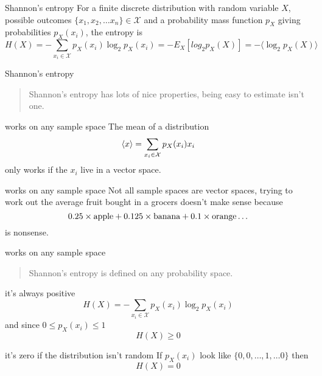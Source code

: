 \documentclass{beamer}
\newcommand{\crish}{\color{reddish}}
\newcommand{\cbla}{\color{black}}
\newcommand{\cblu}{\color{blue}}
\newcommand{\sm}{\color{reddish}$}
\newcommand{\fm}{$\color{black}{}}
\begin{document}
\begin{frame}{Shannon's entropy}
  For a finite discrete distribution with random variable \sm X\fm,
  possible outcomes \sm\{x_1,x_2,\ldots x_n\}\in\mathcal{X}\fm{} and a
  probability mass function \sm p_X\fm{} giving probabilities \sm p_X(x_i)\fm, the
  entropy is
\crish
  $$
H(X)=-\sum_{x_i\in \mathcal{X}}{p_X(x_i)\log_2p_X(x_i)}=-E_X[log_2{p_X(X)}]=-\langle \log_2{p_X(X)}\rangle
  $$
\cbla
\end{frame}

\begin{frame}{Shannon's entropy}
  \begin{quote}
    Shannon's entropy has lots of nice properties, being easy to estimate isn't one.
  \end{quote}
\end{frame}

\begin{frame}{works on any sample space}
The mean of a distribution
\crish
$$
\langle x\rangle = \sum_{x_i\in \mathcal{X}}{p_X(x_i)\cblu{}x_i\crish{}}
$$
\cbla
only works if the \cblu $x_i$\cbla{} live in a vector space. 
  \end{frame}


\begin{frame}{works on any sample space}
Not all sample spaces are vector spaces, trying to work out the average fruit bought in a grocers doesn't make sense because
\crish
$$
0.25\times \mbox{\color{green}apple\crish}+0.125\times \mbox{\color{yellow}banana\crish}+0.1\times \mbox{\color{orange}orange\crish}\ldots
$$ \cbla is nonsense.
  \end{frame}


\begin{frame}{works on any sample space}
  \begin{quote}
    Shannon's entropy is defined on any probability space.
    \end{quote}
  
  \end{frame}


\begin{frame}{it's always positive}
\crish
  $$
H(X)=-\sum_{x_i\in \mathcal{X}}{p_X(x_i)\log_2p_X(x_i)}
$$
\cbla
 and since \sm 0\le p_X(x_i)\le 1 \fm 
 \crish
 $$
 H(X)\ge 0
 $$
 \cbla
\end{frame}

\begin{frame}{it's zero if the distribution isn't random}
  If \sm p_X(x_i)\fm{} look like \sm\{0,0,\dots,1,\ldots 0\}\fm{} then
\crish
 $$
 H(X)= 0
 $$
 \cbla
\end{frame}
\end{document}
